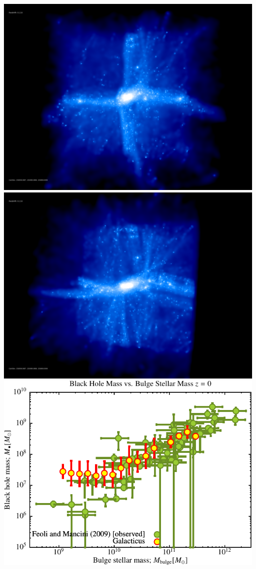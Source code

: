 \includegraphics[scale=0.12]{drd5_r256/rotate_1.png} 
\includegraphics[scale=0.12]{drd5_r256/rotate_2.png} 
\includegraphics[scale=0.6]{drd5_r256/Plot_Black_Hole_vs_Bulge_Mass.pdf}
